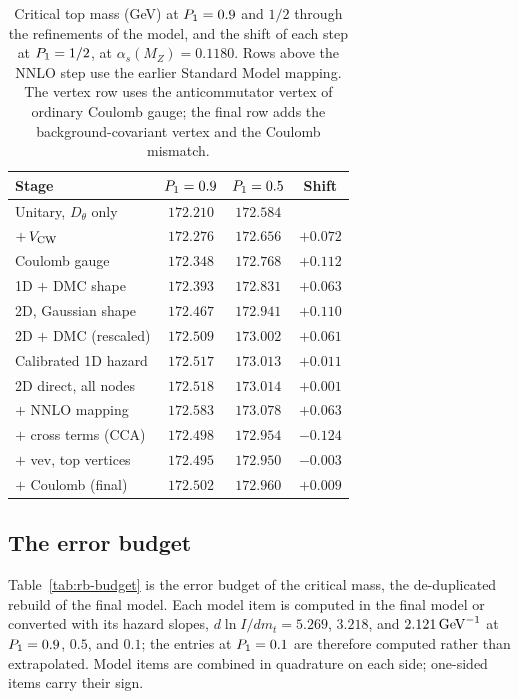 \begin{table}[t]
\centering
\caption{Critical top mass (GeV) at $P_1=0.9$ and $1/2$ through the refinements of the model, and the shift of each step at $P_1=1/2$, at $\alpha_s(M_Z)=0.1180$.
Rows above the NNLO step use the earlier Standard Model mapping.
The vertex row uses the anticommutator vertex of ordinary Coulomb gauge; the final row adds the background-covariant vertex and the Coulomb mismatch.} %
\label{tab:rb-convergence}
\begin{tabular}{lccc}
\toprule
Stage & $P_1=0.9$ & $P_1=0.5$ & Shift \\
\midrule
Unitary, $D_\theta$ only & $172.210$ & $172.584$ & \\ %
$+\,V_{\rm CW}$ & $172.276$ & $172.656$ & $+0.072$ \\ %
Coulomb gauge & $172.348$ & $172.768$ & $+0.112$ \\ %
1D $+$ DMC shape & $172.393$ & $172.831$ & $+0.063$ \\ %
2D, Gaussian shape & $172.467$ & $172.941$ & $+0.110$ \\ %
2D $+$ DMC (rescaled) & $172.509$ & $173.002$ & $+0.061$ \\ %
Calibrated 1D hazard & $172.517$ & $173.013$ & $+0.011$ \\ %
2D direct, all nodes & $172.518$ & $173.014$ & $+0.001$ \\ %
$+$ NNLO mapping & $172.583$ & $173.078$ & $+0.063$ \\ %
$+$ cross terms (CCA) & $172.498$ & $172.954$ & $-0.124$ \\ %
$+$ vev, top vertices & $172.495$ & $172.950$ & $-0.003$ \\ %
$+$ Coulomb (final) & $172.502$ & $172.960$ & $+0.009$ \\ %
\bottomrule
\end{tabular}
\end{table}

\subsection{The error budget}
\label{sec:rb-table}

Table~\ref{tab:rb-budget} is the error budget of the critical mass, the de-duplicated rebuild of the final model.
Each model item is computed in the final model or converted with its hazard slopes, $d\ln I/dm_t=5.269$, $3.218$, and $2.121\,\mathrm{GeV}^{-1}$ at $P_1=0.9$, $0.5$, and $0.1$; the entries at $P_1=0.1$ are therefore computed rather than extrapolated. %
Model items are combined in quadrature on each side; one-sided items carry their sign.

